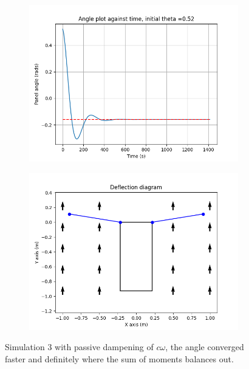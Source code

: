 
%

\begin{figure}[!htb]
\centering
\begin{subfigure}{0.5\textwidth}
  \centering
  \includegraphics[width=1\linewidth]{images/third/theta_plot.png}
  \label{fig:3_theta}
\end{subfigure}%
\begin{subfigure}{.5\textwidth}
  \centering
  \includegraphics[width=1\linewidth]{images/third/deflection_diagram.png}
  \label{fig:3_deflection}
\end{subfigure}
\caption{Simulation 3 with passive dampening of $c\omega$, the angle converged faster and definitely where the sum of moments balances out.}
\label{fig:3_results}
\end{figure}

